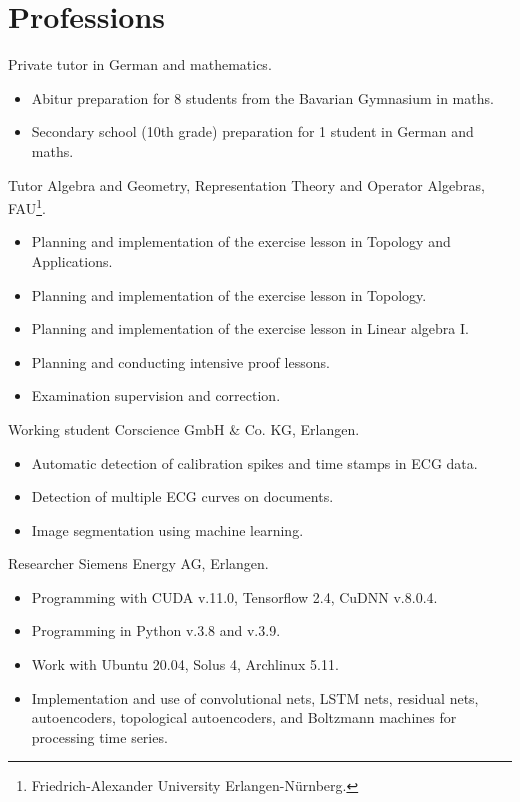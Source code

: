 \documentclass[a4paper,11pt]{article}
\newcommand{\years}[1]{\marginnote{\scriptsize #1}}
\begin{document}
\section*{Professions}
\years{2024--25} Private tutor in German and mathematics.
\begin{itemize}
    \item Abitur preparation for 8 students from the Bavarian Gymnasium in maths.
    \item Secondary school (10th grade) preparation for 1 student in German and maths.
\end{itemize}
\years{2023--24} Tutor Algebra and Geometry, Representation Theory and Operator Algebras, FAU\footnote{Friedrich-Alexander University Erlangen-Nürnberg.}.
\begin{itemize}
    \item Planning and implementation of the exercise lesson in \glqq Topology and Applications\grqq.
    \item Planning and implementation of the exercise lesson in \glqq Topology\grqq.
    \item Planning and implementation of the exercise lesson in \glqq Linear algebra I\grqq.
    \item Planning and conducting intensive proof lessons.
    \item Examination supervision and correction.
\end{itemize}
\years{2021--22} Working student Corscience GmbH \& Co. KG, Erlangen.
\begin{itemize}
    \item Automatic detection of calibration spikes and time stamps in ECG data.
    \item Detection of multiple ECG curves on documents.
    \item Image segmentation using machine learning.
\end{itemize}
\years{2019--21} Researcher Siemens Energy AG, Erlangen.
\begin{itemize}
    \item Programming with CUDA v.11.0, Tensorflow 2.4, CuDNN v.8.0.4.
    \item Programming in Python v.3.8 and v.3.9.
    \item Work with Ubuntu 20.04, Solus 4, Archlinux 5.11.
    \item Implementation and use of convolutional nets, LSTM nets, residual nets, autoencoders, topological autoencoders, and Boltzmann machines for processing time series.
\end{itemize}
\end{document}
